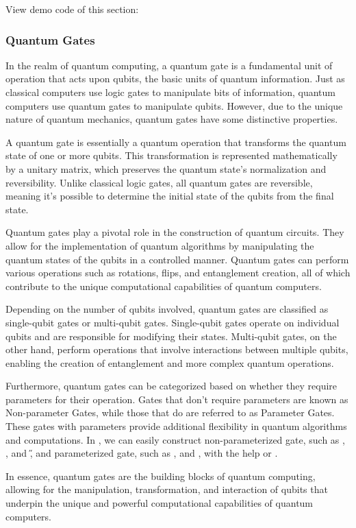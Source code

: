 View demo code of this section: 

\subsubsection{Quantum Gates}
In the realm of quantum computing, a quantum gate is a fundamental unit of operation that acts upon qubits, the basic units of quantum information. Just as classical computers use logic gates to manipulate bits of information, quantum computers use quantum gates to manipulate qubits. However, due to the unique nature of quantum mechanics, quantum gates have some distinctive properties.

A quantum gate is essentially a quantum operation that transforms the quantum state of one or more qubits. This transformation is represented mathematically by a unitary matrix, which preserves the quantum state's normalization and reversibility. Unlike classical logic gates, all quantum gates are reversible, meaning it's possible to determine the initial state of the qubits from the final state.

Quantum gates play a pivotal role in the construction of quantum circuits. They allow for the implementation of quantum algorithms by manipulating the quantum states of the qubits in a controlled manner. Quantum gates can perform various operations such as rotations, flips, and entanglement creation, all of which contribute to the unique computational capabilities of quantum computers.

Depending on the number of qubits involved, quantum gates are classified as single-qubit gates or multi-qubit gates. Single-qubit gates operate on individual qubits and are responsible for modifying their states. Multi-qubit gates, on the other hand, perform operations that involve interactions between multiple qubits, enabling the creation of entanglement and more complex quantum operations.

Furthermore, quantum gates can be categorized based on whether they require parameters for their operation. Gates that don't require parameters are known as Non-parameter Gates, while those that do are referred to as Parameter Gates. These gates with parameters provide additional flexibility in quantum algorithms and computations. In \MindQuantum, we can easily construct non-parameterized gate, such as \X, \Y, \Z and \H, and parameterized gate, such as \RX, \RY and \RZ, with the help or \ParameterResolver.

In essence, quantum gates are the building blocks of quantum computing, allowing for the manipulation, transformation, and interaction of qubits that underpin the unique and powerful computational capabilities of quantum computers.

